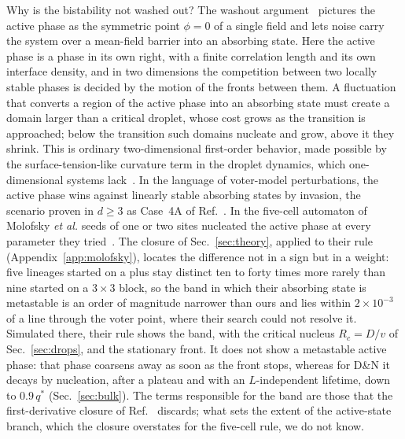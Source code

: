 \documentclass[pre,twocolumn,superscriptaddress,showpacs,floatfix]{revtex4-2}
\newcommand{\qs}{q^{*}}
\begin{document}
Why is the bistability not washed out? The washout argument~\cite{castellano2009} pictures the
active phase as the symmetric point $\phi = 0$ of a single field and lets noise carry the system
over a mean-field barrier into an absorbing state. Here the active phase is a phase in its own
right, with a finite correlation length and its own interface density, and in two dimensions the
competition between two locally stable phases is decided by the motion of the fronts between them.
A fluctuation that converts a region of the active phase into an absorbing state must create a
domain larger than a critical droplet, whose cost grows as the transition is approached; below
the transition such domains nucleate and grow, above it they shrink. This is ordinary
two-dimensional first-order behavior, made possible by the surface-tension-like
curvature term in the droplet dynamics, which one-dimensional systems lack~\cite{hinrichsen2000fo}.
In the language of voter-model perturbations, the active phase wins against linearly stable
absorbing states by invasion, the scenario proven in $d\ge3$ as Case~4A of Ref.~\cite{cox2013}.
In the five-cell automaton of Molofsky \emph{et al.} seeds of one or two sites nucleated the
active phase at every parameter they tried~\cite{molofsky1999}. The closure of
Sec.~\ref{sec:theory}, applied to their rule (Appendix~\ref{app:molofsky}), locates the
difference not in a sign but in a weight: five lineages started on a plus stay distinct ten to
forty times more rarely than nine started on a $3\times3$ block, so the band in which their
absorbing state is metastable is an order of magnitude narrower than ours and lies within
$2\times10^{-3}$ of a line through the voter point, where their search could not resolve it.
Simulated there, their rule shows the band, with the critical nucleus $R_c = D/v$ of
Sec.~\ref{sec:drops}, and the stationary front. It does not show a metastable active phase:
that phase coarsens away as soon as the front stops, whereas for D\&N it decays by nucleation,
after a plateau and with an $L$-independent lifetime, down to $0.9\,\qs$ (Sec.~\ref{sec:bulk}).
The terms responsible for the band are those that the first-derivative closure of
Ref.~\cite{vazquez2008} discards; what sets the extent of the active-state branch, which the
closure overstates for the five-cell rule, we do not know.
\end{document}
